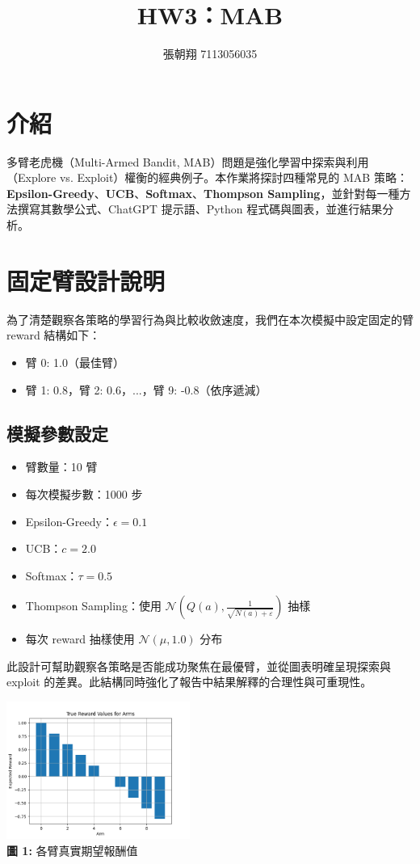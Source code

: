 \documentclass{article}
\title{HW3：MAB}
\author{張朝翔 7113056035}
\date{}
\begin{document}
\maketitle

\section{介紹}
多臂老虎機（Multi-Armed Bandit, MAB）問題是強化學習中探索與利用（Explore vs. Exploit）權衡的經典例子。本作業將探討四種常見的 MAB 策略：\textbf{Epsilon-Greedy}、\textbf{UCB}、\textbf{Softmax}、\textbf{Thompson Sampling}，並針對每一種方法撰寫其數學公式、ChatGPT 提示語、Python 程式碼與圖表，並進行結果分析。

\section{固定臂設計說明}

為了清楚觀察各策略的學習行為與比較收斂速度，我們在本次模擬中設定固定的臂 reward 結構如下：

\begin{itemize}
  \item 臂 0: 1.0（最佳臂）
  \item 臂 1: 0.8，臂 2: 0.6，...，臂 9: -0.8（依序遞減）
\end{itemize}

\subsection*{模擬參數設定}
\begin{itemize}
  \item 臂數量：10 臂
  \item 每次模擬步數：1000 步
  \item Epsilon-Greedy：$\epsilon = 0.1$
  \item UCB：$c = 2.0$
  \item Softmax：$\tau = 0.5$
  \item Thompson Sampling：使用 $\mathcal{N}(Q(a), \frac{1}{\sqrt{N(a)+\varepsilon}})$ 抽樣
  \item 每次 reward 抽樣使用 $\mathcal{N}(\mu, 1.0)$ 分布
\end{itemize}

此設計可幫助觀察各策略是否能成功聚焦在最優臂，並從圖表明確呈現探索與 exploit 的差異。此結構同時強化了報告中結果解釋的合理性與可重現性。

\begin{center}
\includegraphics[width=0.45\textwidth]{./plots/true_rewards.png} \\
\textbf{圖 1:} 各臂真實期望報酬值
\end{center}
\end{document}
